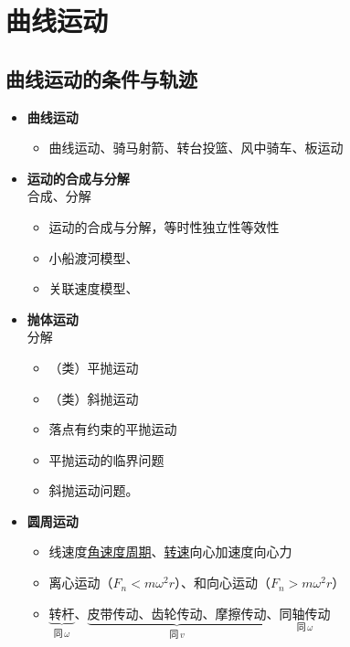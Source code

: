 \chapter{曲线运动}
\label{ch:04}

\section{曲线运动的条件与轨迹}
\begin{itemize}
  \item \textbf{曲线运动}
  \begin{itemize}
    \item 曲线运动、骑马射箭、转台投篮、风中骑车、板运动
  \end{itemize}
  \item \textbf{运动的合成与分解}\\ 合成、分解
  \begin{itemize}
    \item 运动的合成与分解，\quad 等时性\quad 独立性\quad 等效性
    \item 小船渡河模型、
    \item 关联速度模型、 %
  \end{itemize}
  \item \textbf{抛体运动}\\ 分解
  \begin{itemize}
    \item （类）平抛运动
    \item （类）斜抛运动
    \item 落点有约束的平抛运动
    \item 平抛运动的临界问题
    \item 斜抛运动问题。
  \end{itemize}
  \item \textbf{圆周运动}\\ 
  \begin{itemize}
    \item 线速度\quad \underline{角速度}\quad \underline{周期}、\underline{转速}\quad 向心加速度\quad 向心力
    \item 离心运动（$F_n<m\omega^2 r$）、和向心运动（$F_n>m\omega^2 r$） %
    \item $\underbrace{\text{转杆}}_{\text{同}\,\omega}$、$\underbrace{\text{皮带传动、齿轮传动、摩擦传动}}_{\text{同}\,v}$、$\underset{\text{同}\,\omega}{\text{同轴传动}}$ %
  \end{itemize}
\end{itemize}

